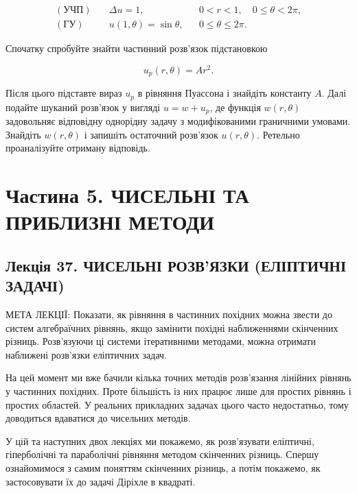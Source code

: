 \documentclass[
  ukrainian,
]{article}
\begin{document}
\[\begin{aligned}(\text{УЧП})\quad & \Delta u = 1, && 0 < r < 1,\quad 0 \le \theta < 2\pi,\\(\text{ГУ})\quad & u(1,\theta)=\sin\theta, && 0 \le \theta \le 2\pi.\end{aligned}\]

Спочатку спробуйте знайти частинний розв'язок підстановкою

\[u_p(r,\theta)=Ar^2.\]

Після цього підставте вираз \(u_p\) в рівняння Пуассона і знайдіть
константу \(A\). Далі подайте шуканий розв'язок у вигляді \(u=w+u_p\),
де функція \(w(r,\theta)\) задовольняє відповідну однорідну задачу з
модифікованими граничними умовами. Знайдіть \(w(r,\theta)\) і запишіть
остаточний розв'язок \(u(r,\theta)\). Ретельно проаналізуйте отриману
відповідь.

\section{Частина 5. ЧИСЕЛЬНІ ТА ПРИБЛИЗНІ
МЕТОДИ}\label{ux447ux430ux441ux442ux438ux43dux430-5.-ux447ux438ux441ux435ux43bux44cux43dux456-ux442ux430-ux43fux440ux438ux431ux43bux438ux437ux43dux456-ux43cux435ux442ux43eux434ux438}

\subsection{Лекція 37. ЧИСЕЛЬНІ РОЗВ'ЯЗКИ (ЕЛІПТИЧНІ
ЗАДАЧІ)}\label{ux43bux435ux43aux446ux456ux44f-37.-ux447ux438ux441ux435ux43bux44cux43dux456-ux440ux43eux437ux432ux44fux437ux43aux438-ux435ux43bux456ux43fux442ux438ux447ux43dux456-ux437ux430ux434ux430ux447ux456}

МЕТА ЛЕКЦІЇ: Показати, як рівняння в частинних похідних можна звести до
систем алгебраїчних рівнянь, якщо замінити похідні наближеннями
скінченних різниць. Розв'язуючи ці системи ітеративними методами, можна
отримати наближені розв'язки еліптичних задач.

На цей момент ми вже бачили кілька точних методів розв'язання лінійних
рівнянь у частинних похідних. Проте більшість із них працює лише для
простих рівнянь і простих областей. У реальних прикладних задачах цього
часто недостатньо, тому доводиться вдаватися до чисельних методів.

У цій та наступних двох лекціях ми покажемо, як розв'язувати еліптичні,
гіперболічні та параболічні рівняння методом скінченних різниць. Спершу
ознайомимося з самим поняттям скінченних різниць, а потім покажемо, як
застосовувати їх до задачі Діріхле в квадраті.
\end{document}
